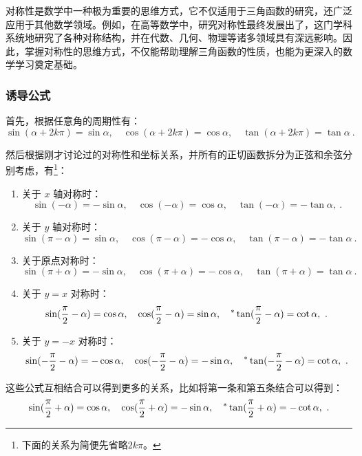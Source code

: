 对称性是数学中一种极为重要的思维方式，它不仅适用于三角函数的研究，还广泛应用于其他数学领域。例如，在高等数学中，研究对称性最终发展出了，这门学科系统地研究了各种对称结构，并在代数、几何、物理等诸多领域具有深远影响。因此，掌握对称性的思维方式，不仅能帮助理解三角函数的性质，也能为更深入的数学学习奠定基础。

\subsubsection{诱导公式}

首先，根据任意角的周期性有：
\begin{equation}
\sin(\alpha + 2k\pi) = \sin \alpha, \quad \cos(\alpha + 2k\pi) = \cos \alpha,\quad \tan(\alpha+ 2k\pi)=\tan\alpha~.
\end{equation}

然后根据刚才讨论过的对称性和坐标关系，并所有的正切函数拆分为正弦和余弦分别考虑，有\footnote{下面的关系为简便先省略$2k\pi$。}：
\begin{enumerate}
\item 关于 $x$ 轴对称时：
\begin{equation}\label{eq_HsTrFu_14}
\sin(-\alpha)=-\sin\alpha,\quad \cos(-\alpha) = \cos \alpha,\quad \tan(-\alpha)=-\tan\alpha,~.
\end{equation}
\item 关于 $y$ 轴对称时：
\begin{equation}
\sin(\pi-\alpha)=\sin\alpha,\quad \cos(\pi-\alpha) = -\cos \alpha,\quad \tan(\pi-\alpha)=-\tan\alpha~.
\end{equation}
\item 关于原点对称时：
\begin{equation}
\sin(\pi+\alpha)=-\sin\alpha,\quad \cos(\pi+\alpha) = -\cos \alpha,\quad \tan(\pi+\alpha) = \tan \alpha~.
\end{equation}
\item 关于 $y = x$ 对称时：
\begin{equation}
\sin({\pi\over2}-\alpha)=\cos\alpha,\quad \cos({\pi\over2}-\alpha) = \sin \alpha,\quad ^*\tan({\pi\over2}-\alpha) = \cot \alpha,~.
\end{equation}
\item 关于 $y = -x$ 对称时：
\begin{equation}
\sin(-{\pi\over2}-\alpha)=-\cos\alpha,\quad \cos(-{\pi\over2}-\alpha) = -\sin \alpha,\quad ^*\tan(-{\pi\over2}-\alpha) = \cot \alpha,~.
\end{equation}
\end{enumerate}
这些公式互相结合可以得到更多的关系，比如将第一条和第五条结合可以得到：
\begin{equation}\label{eq_HsTrFu_15}
\sin({\pi\over2}+\alpha)=\cos\alpha,\quad \cos({\pi\over2}+\alpha) = -\sin \alpha,\quad ^*\tan({\pi\over2}+\alpha) = -\cot \alpha,~.
\end{equation}

